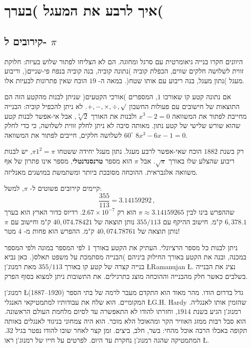 

\chapter{איך לרבע את המעגל )בערך(}\label{c.square-a-circle}


\section{%
קירובים ל-%
$\pi$}

היוונים חקרו בנייה גיאומרטית עם סרגל ומחוגה. הם לא הצליחו לפתור שלוש בעיות: חלוקת זווית לשלושה חלקים שווים, הכפלת קוביה )נתונה קוביה, בנה קוביה בנפח פי-שניים(, וריבוע מעגל )נתון מעגל, בנה ריבוע עם אותו שטח(. במאה ה-%
$19$
הוכח שאין פתרונות לבעיות אלו.

אם נתונה קטע קו שאורכו
$1$,
המספרים )אורכי הקטעים( שניתן לבנות מהקטע הזה הם התוצאות של חישובים עם פעולות החשבון
$+,-,\times,\div,\surd$.
לא ניתן להכפיל קוביה: הבנייה מחייבת לפתור את המשוואה
$x^3-2=0$
ולבנות את האורך
$\sqrt[3]{2}$,
אבל אי-אפשר לבנות קטע שהוא שורש שלישי של קטע נתון. מאותה סיבה לא ניתן לחלק זווית לשלושה, כי כדי לחלק 
$60^\circ$
לשלושה חלקים, חייבים לפתור את המשוואה 
$8x^3-6x-1=0$.

רק בשנת
$1882$
הוכח שאי-אפשר לרבע מעגל. נתון מעגל יחידה ששטחו
$\pi 1^2=\pi$,
יש לבנות ריבוע שהצלע שלו באורך
$\sqrt{\pi}$.
אבל
$\pi$
הוא מספר
\textbf{טרנסנדנטלי},
מספר אינו פתרון של אף משוואה אלגבראית. ההוכחה מסובכת ביותר ומשתמשת במושגים מאנליזה.

קיימים קירובים פשוטים ל-%
$\pi$,
למשל:
\[
\frac{355}{113}=3.14159292\,,
\]
שההפרש בינו לבין
$\pi\approx 3.14159265$
הוא רק 
$2.67\times 10^{-7}$.
רדיוס כדור הארץ הוא בערך
$6,378.1$
ק"מ. חישוב ההיקף עם
$355/113$
נותן תוצאה של
$40,074.78421$
ק"מ וחישוב עם
$\pi$
נותן תוצאה של
$40,074.78761$
ק"מ. ההפרש הוא פחות מ-%
$4$
מטר!

ניתן לבנות כל מספר הרציונלי. העתיק את הקטע באורך 
$1$
לפי המספר במונה ולפי המספר במכנה, ובנה את הקטע באורך החילוק ביניהם )הבנייה מסתמכת על משפט תאלס(. כאן נביא בנייה קצרה של קטע קו באורך
$355/113$
מאת רמנוג'ן
\L{Ramanujan}
\L{\cite{ramanujan}}.
נציג את הבנייה בשלבים כאשר חלק מהבנייה וההוכחה מוצג כתרגילים. את התשובות ניתן למצוא בסוף הפרק.

רמנוג'ן
\L{(1887--1920)}
גדל בדרום הודו. מהר מאוד הוא התקדם מעבר לרמה של בתי הספר המקומיים. הוא שלח את עבודותיו למתמטיקאי האנגלי
\L{G.H. Hardy}
שהזמין אותו לאנגליה. רמנוג'ן הגיע בשנת
$1914$,
וחזרתו להודו לא התאפשרה עד לסיום מלחמת העולם הראשונה. הוא סבל רבות ממזג האוויר הקר ומהאוכל הלא מוכר. הוא היה צמחוני בניגוד לאנגלים באותה תקופה באכלו הרבה אוכל מהחי: בשר, חלב, ביצים. זמן קצר לאחר שובו להודו נפטר בגיל 
$32$.
המתמטיקה שהגה רמנוג'ן נחקרת עד היום. לפרטים על חייו של רמנוג'ן ראו
\L{\cite{kanigel}}.



